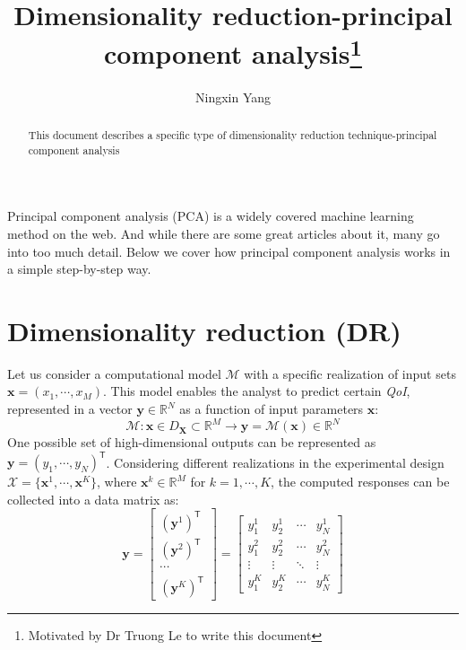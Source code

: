 \documentclass{tufte-handout}
\title{Dimensionality reduction-principal component analysis\thanks{Motivated by Dr Truong Le to write this document }}
\author[Ningxin Yang]{Ningxin Yang}
\begin{document}
\maketitle%

\begin{abstract}
\noindent
This document describes a specific type of dimensionality reduction technique-principal component analysis
\end{abstract}


Principal component analysis (PCA) is a widely covered machine learning method on the web. And while there are some great articles about it, many go into too much detail. Below we cover how principal component analysis works in a simple step-by-step way.
\section{Dimensionality reduction (DR)}\label{sec:DR}
Let us consider a computational model $\mathcal{M}$ with a specific realization of input sets $\boldsymbol{x} = (x_1,\cdots,x_M)$. This model enables the analyst to predict certain \textit{QoI}, represented in a vector $\boldsymbol{y} \in \mathbb{R}^N$ as a function of input parameters $\boldsymbol{x}$:
\begin{equation}
    \label{eq:UQ_model}
    \mathcal{M}:\boldsymbol{x} \in D_{\boldsymbol{X}} \subset \mathbb{R}^M \rightarrow
    \boldsymbol{y}  = \mathcal{M}(\boldsymbol{x}) \in \mathbb{R}^N 
\end{equation}
One possible set of high-dimensional outputs can be represented as $\boldsymbol{y} = (y_1, \cdots, y_{N})^{\mathsf{T}}$. Considering different realizations in the experimental design $\mathcal{X} = \{\boldsymbol{x}^{1}, \cdots, \boldsymbol{x}^{K}\}$, where $\boldsymbol{x}^{k} \in \mathbb{R}^M$ for $k = 1, \cdots, K$, the computed responses can be collected into a data matrix as:
\begin{equation}
\label{eq:high-outputs}
    \boldsymbol{y} = 
\begin{bmatrix}
({\boldsymbol{y}^{1}})^{\mathsf{T}} \\
({\boldsymbol{y}^{2}})^{\mathsf{T}} \\
\cdots \\
({\boldsymbol{y}^{K}})^{\mathsf{T}} 
\end{bmatrix}
=
\begin{bmatrix}
y_{1}^{1} & y_{2}^{1} & \cdots & y_{N}^{1} \\
y_{1}^{2} & y_{2}^{2} & \cdots & y_{N}^{2}  \\
\vdots & \vdots & \ddots & \vdots \\
y_{1}^{K} & y_{2}^{K} & \cdots & y_{N}^{K}
\end{bmatrix} 
\end{equation}
\end{document}
